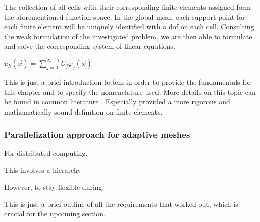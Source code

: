 The collection of all cells with their corresponding finite elements assigned form the aforementioned function space. In the global mesh, each support point for each finite element will be uniquely identified with a \gls{dof} on each cell. Consulting the weak formulation of the investigated problem, we are then able to formulate and solve the corresponding system of linear equations.

$u_h(\vec{x}) = \sum_{j=0}^{N-1} U_j \varphi_j(\vec{x})$

This is just a brief introduction to \gls{fem} in order to provide the fundamentals for this chapter and to specify the nomenclature used. More details on this topic can be found in common literature \parencite[e.g.][]{girault1986, elman2014, kuzmin2015} . Especially \textcite{brenner2008} provided a more rigorous and mathematically sound definition on finite elements.


\subsubsection{Parallelization approach for adaptive meshes}

For distributed computing.

This involves a hierarchy

However, to stay flexible during 

This is just a brief outline of all the requirements that \textcite{bangerth2012} worked out, which is crucial for the upcoming section.




